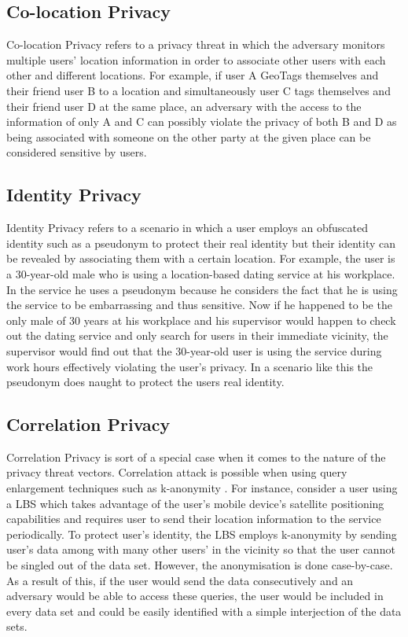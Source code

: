 \documentclass[english]{tktltiki2}
\theoremstyle{definition}
\theoremstyle{remark}
\begin{document}
\subsection{Co-location Privacy}
Co-location Privacy refers to a privacy threat in which the adversary monitors multiple users' location information in order to associate other users with each other and different locations. For example, if user A GeoTags themselves and their friend user B to a location and simultaneously user C tags themselves and their friend user D at the same place, an adversary with the access to the information of only A and C can possibly violate the privacy of both B and D as being associated with someone on the other party at the given place can be considered sensitive by users.

\subsection{Identity Privacy}
Identity Privacy refers to a scenario in which a user employs an obfuscated identity such as a pseudonym to protect their real identity but their identity can be revealed by associating them with a certain location. For example, the user is a 30-year-old male who is using a location-based dating service at his workplace. In the service he uses a pseudonym because he considers the fact that he is using the service to be embarrassing and thus sensitive. Now if he happened to be the only male of 30 years at his workplace and his supervisor would happen to check out the dating service and only search for users in their immediate vicinity, the supervisor would find out that the 30-year-old user is using the service during work hours effectively violating the user's privacy. In a scenario like this the pseudonym does naught to protect the users real identity.

\subsection{Correlation Privacy}
Correlation Privacy is sort of a special case when it comes to the nature of the privacy threat vectors. Correlation attack is possible when using query enlargement techniques such as k-anonymity \cite{Sweeney:2002:KAM:774544.774552}. For instance, consider a user using a LBS which takes advantage of the user's mobile device's satellite positioning capabilities and requires user to send their location information to the service periodically. To protect user's identity, the LBS employs k-anonymity by sending user's data among with many other users' in the vicinity so that the user cannot be singled out of the data set. However, the anonymisation is done case-by-case. As a result of this, if the user would send the data consecutively and an adversary would be able to access these queries, the user would be included in every data set and could be easily identified with a simple interjection of the data sets.
\end{document}
